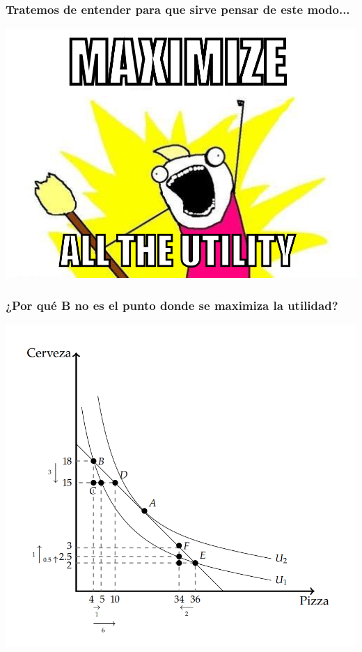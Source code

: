 \documentclass{beamer}
\begin{document}
\begin{frame}
\frametitle{Tratemos de entender para que sirve pensar de este modo...}
\centering
\includegraphics[scale=0.5]{Slides Principios de Economia/Figures/Tema_02.23_rp21.png}
\end{frame}

\begin{frame}
\frametitle{¿Por qué B no es el punto donde se maximiza la utilidad?}
\centering
\includegraphics[scale=0.6]{Slides Principios de Economia/Figures/C8.3.png}
\end{frame}
\end{document}
